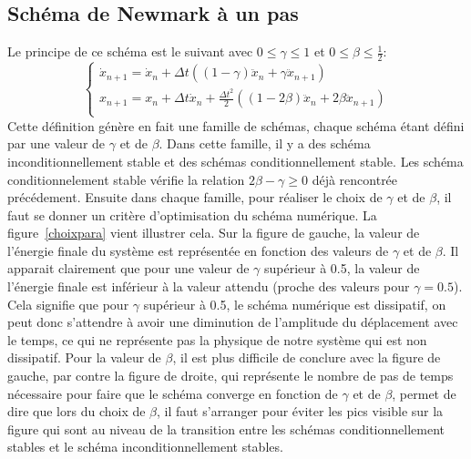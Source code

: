 \documentclass[]{article}
\begin{document}
\subsection{Schéma de Newmark à un pas}

Le principe de ce schéma est le suivant avec $0\leq\gamma\leq1$ et
$0\leq\beta\leq\frac{1}{2}$:
\[
\left \{
\begin{array}{l}
    \dot{x}_{n+1} = \dot{x}_{n} + \Delta t\left( \left( 1 - \gamma\right)  
\ddot{x}_{n} + \gamma \ddot{x}_{n+1}\right)  \\
    x_{n+1} = x_{n} + \Delta t\dot{x}_{n} + \frac{\Delta t^{2}}{2}\left(
\left(1 - 2 \beta\right) \ddot{x}_{n} + 2\beta\ddot{x}_{n+1}\right)  \\
\end{array}
\right.
\]
Cette définition génère en fait une famille de schémas, chaque schéma étant
défini par une valeur de $\gamma$ et de $\beta$. Dans cette famille, il y a des
schéma inconditionnellement stable et des schémas conditionnellement stable.
Les schéma conditionnelement stable vérifie la relation $2\beta-\gamma\geq0$
déjà rencontrée précédement. Ensuite dans chaque famille, pour réaliser le
choix de $\gamma$ et de $\beta$, il faut se donner un critère d'optimisation du
schéma numérique. La figure~\ref{choixpara} vient illustrer cela. Sur la figure
de gauche, la valeur de l'énergie finale du système est représentée en fonction
des valeurs de $\gamma$ et de $\beta$. Il apparait clairement que pour une
valeur de $\gamma$ supérieur à 0.5, la valeur de l'énergie finale est inférieur
à la valeur attendu (proche des valeurs pour $\gamma=0.5$). Cela signifie que
pour $\gamma$ supérieur à 0.5, le schéma numérique est dissipatif, on peut donc
s'attendre à avoir une diminution de l'amplitude du déplacement avec le temps,
ce qui ne représente pas la physique de notre système qui est non dissipatif.
Pour la valeur de $\beta$, il est plus difficile de conclure avec la figure de
gauche, par contre la figure de droite, qui représente le nombre de pas de
temps nécessaire pour faire que le schéma converge en fonction de $\gamma$ et de
$\beta$, permet de dire que lors du choix de $\beta$, il faut s'arranger pour
éviter les pics visible sur la figure qui sont au niveau de la transition entre
les schémas conditionnellement stables et le schéma inconditionnellement
stables.
\end{document}
